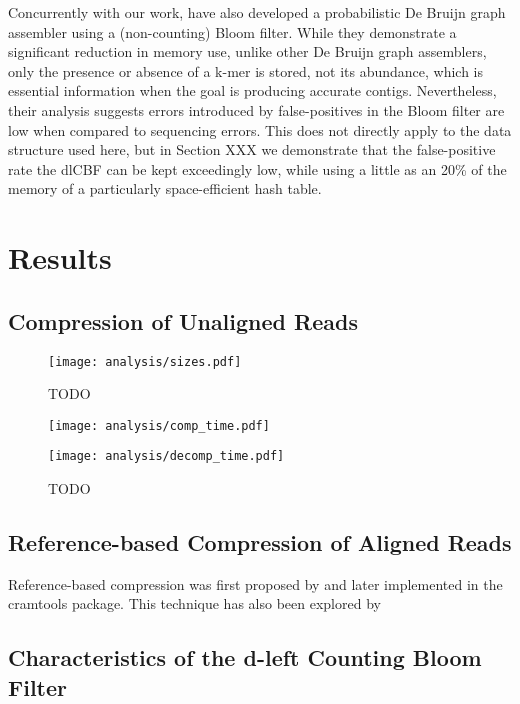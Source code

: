 \documentclass[twocolumn]{article}
\begin{document}
Concurrently with our work, \citet{Pell2011} have also developed a
probabilistic De Bruijn graph assembler using a (non-counting) Bloom filter.
While they demonstrate a significant reduction in memory use, unlike other De
Bruijn graph assemblers, only the presence or absence of a k-mer is stored, not
its abundance, which is essential information when the goal is producing
accurate contigs. Nevertheless, their analysis suggests errors introduced by
false-positives in the Bloom filter are low when compared to sequencing
errors. This does not directly apply to the data structure used here, but in
Section XXX we demonstrate that the false-positive rate the dlCBF can be kept
exceedingly low, while using a little as an 20\% of the memory of a
particularly space-efficient hash table.






\section{Results}


\subsection{Compression of Unaligned Reads}

\begin{figure*}
\centerline{\texttt{[image: analysis/sizes.pdf]}}
\caption{TODO}
\label{fig:sizes}
\end{figure*}

\begin{figure*}
\centerline{\texttt{[image: analysis/comp\_time.pdf]}}
\centerline{\texttt{[image: analysis/decomp\_time.pdf]}}
\caption{TODO}
\label{fig:comp_decomp_time}
\end{figure*}

\subsection{Reference-based Compression of Aligned Reads}

Reference-based compression was first proposed by \citet{Hsi-YangFritz2011}
and later implemented in the cramtools package. This technique has also been explored
by 

\subsection{Characteristics of the d-left Counting Bloom Filter}
\end{document}
